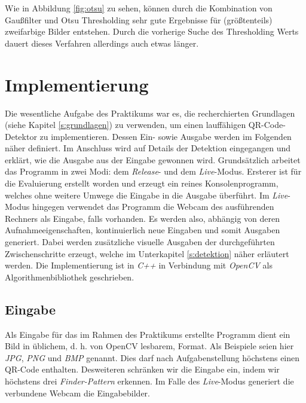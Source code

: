 \documentclass[a4paper, oneside, 12pt]{article}
\begin{document}
Wie in Abbildung \ref{fig:otsu} zu sehen, können durch die Kombination von Gaußfilter und Otsu Thresholding sehr gute Ergebnisse für (größtenteils) zweifarbige Bilder entstehen. Durch die vorherige Suche des Thresholding Werts dauert dieses Verfahren allerdings auch etwas länger.


\newpage

\section{Implementierung}
\label{s:implementierung}

Die wesentliche Aufgabe des Praktikums war es, die recherchierten Grundlagen (siehe Kapitel \ref{s:grundlagen}) zu verwenden, um einen lauffähigen QR-Code-Detektor zu implementieren. Dessen Ein- sowie Ausgabe werden im Folgenden näher definiert.
Im Anschluss wird auf Details der Detektion eingegangen und erklärt, wie die Ausgabe aus der Eingabe gewonnen wird.
Grundsätzlich arbeitet das Programm in zwei Modi: dem \emph{Release}- und dem \emph{Live}-Modus.
Ersterer ist für die Evaluierung erstellt worden und erzeugt ein reines Konsolenprogramm, welches ohne weitere Umwege die Eingabe in die Ausgabe überführt.
Im \emph{Live}-Modus hingegen verwendet das Programm die Webcam des ausführenden Rechners als Eingabe, falls vorhanden. Es werden also, abhängig von deren Aufnahmeeigenschaften, kontinuierlich neue Eingaben und somit Ausgaben generiert. Dabei werden zusätzliche visuelle Ausgaben der durchgeführten Zwischenschritte erzeugt, welche im Unterkapitel \ref{s:detektion} näher erläutert werden.
Die Implementierung ist in \emph{C++} \cite{stroustrup1995c++} in Verbindung mit \emph{OpenCV} \cite{bradski2008learning} als Algorithmenbibliothek geschrieben.

\subsection{Eingabe}
\label{s:eingabe}

Als Eingabe für das im Rahmen des Praktikums erstellte Programm dient ein Bild in üblichem, d. h. von OpenCV lesbarem, Format. Als Beispiele seien hier \emph{JPG}, \emph{PNG} und \emph{BMP} genannt.
Dies darf nach Aufgabenstellung höchstens einen QR-Code enthalten.
Desweiteren schränken wir die Eingabe ein, indem wir höchstens drei \emph{Finder-Pattern} erkennen.
Im Falle des \emph{Live}-Modus generiert die verbundene Webcam die Eingabebilder.
\end{document}
